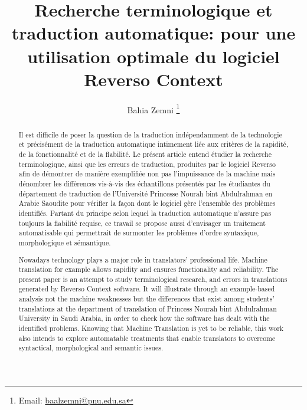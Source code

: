 \documentclass{textolivre}
\title{Recherche terminologique et traduction automatique: pour une utilisation optimale du logiciel Reverso Context}
\author[1]{Bahia Zemni \orcid{0000-0002-6238-7509} \thanks{Email: \url{baalzemni@pnu.edu.sa}}}
\affil[1]{Princess Nourah bint Abdulrahman University, Arabie Saoudite.}
\begin{document}
\maketitle

\begin{polyabstract}
\begin{french}
\begin{abstract}
Il est difficile de poser la question de la traduction indépendamment de la technologie et précisément de la traduction automatique intimement liée aux critères de la rapidité, de la fonctionnalité et de la fiabilité. Le présent article entend étudier la recherche terminologique, ainsi que les erreurs de traduction, produites par le logiciel Reverso afin de démontrer de manière exemplifiée non pas l’impuissance de la machine mais dénombrer les différences vis-à-vis des échantillons présentés par les étudiantes du département de traduction de l’Université Princesse Nourah bint Abdulrahman en Arabie Saoudite pour vérifier la façon dont le logiciel gère l’ensemble des problèmes identifiés. Partant du principe selon lequel la traduction automatique n’assure pas toujours la fiabilité requise, ce travail se propose aussi d’envisager un traitement automatisable qui permettrait de surmonter les problèmes d’ordre syntaxique, morphologique et sémantique.

\end{abstract}
\end{french}

\begin{english}
\begin{abstract}
Nowadays technology plays a major role in translators’ professional life. Machine translation for example allows rapidity and ensures functionality and reliability. The present paper is an attempt to study terminological research, and errors in translations generated by Reverso Context software. It will illustrate through an example-based analysis not the machine weaknesses but the differences that exist among students’ translations at the department of translation of Princess Nourah bint Abdulrahman University in Saudi Arabia, in order to check how the software has dealt with the identified problems. Knowing that Machine Translation is yet to be reliable, this work also intends to explore automatable treatments that enable translators to overcome syntactical, morphological and semantic issues.


\end{abstract}
\end{english}
\end{polyabstract}
\end{document}
